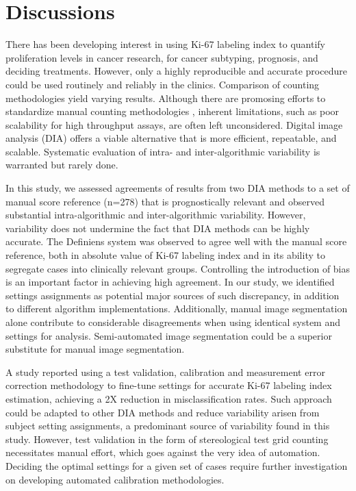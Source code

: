 \documentclass[final,1p,times]{elsarticle}
\begin{document}
\section*{Discussions}

There has been developing interest in using Ki-67 labeling index to quantify proliferation levels in cancer research, for cancer subtyping, prognosis, and deciding treatments. However, only a highly reproducible and accurate procedure could be used routinely and reliably in the clinics. Comparison of counting methodologies yield varying results. \cite{Mikami2013, Reid2015} Although there are promosing efforts to standardize manual counting methodologies \cite{Polley2013a, Polley2015}, inherent limitations, such as poor scalability for high throughput assays, are often left unconsidered. Digital image analysis (DIA) offers a viable alternative that is more efficient, repeatable, and scalable. Systematic evaluation of intra- and inter-algorithmic variability is warranted but rarely done.

In this study, we assessed agreements of results from two DIA methods to a set of manual score reference (n=278) that is prognostically relevant and observed substantial intra-algorithmic and inter-algorithmic variability. However, variability does not undermine the fact that DIA methods can be highly accurate. The Definiens system was observed to agree well with the manual score reference, both in absolute value of Ki-67 labeling index and in its ability to segregate cases into clinically relevant groups. Controlling the introduction of bias is an important factor in achieving high agreement. In our study, we identified settings assignments as potential major sources of such discrepancy, in addition to different algorithm implementations. Additionally, manual image segmentation alone contribute to considerable disagreements when using identical system and settings for analysis. Semi-automated image segmentation could be a superior substitute for manual image segmentation.

A study reported using a test validation, calibration and measurement error correction methodology to fine-tune settings for accurate Ki-67 labeling index estimation, achieving a 2X reduction in misclassification rates. \cite{Laurinavicius2014} Such approach could be adapted to other DIA methods and reduce variability arisen from subject setting assignments, a predominant source of variability found in this study. However, test validation in the form of stereological test grid counting necessitates manual effort, which goes against the very idea of automation. Deciding the optimal settings for a given set of cases require further investigation on developing automated calibration methodologies.
\end{document}
